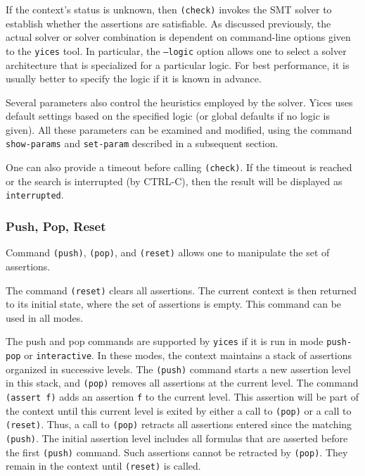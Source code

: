 \documentclass[11pt,twoside,fleqn,openright,titlepage]{cslreport}
\begin{document}
\medskip\noindent
If the context's status is unknown, then \texttt{(check)} invokes the
SMT solver to establish whether the assertions are satisfiable. As
discussed previously, the actual solver or solver combination is
dependent on command-line options given to the \texttt{yices} tool. In
particular, the \texttt{--logic} option allows one to select a solver
architecture that is specialized for a particular logic. For best
performance, it is usually better to specify the logic if it is known
in advance.

\medskip\noindent Several parameters also control the heuristics employed
by the solver. Yices uses default settings based on the specified logic
(or global defaults if no logic is given). All these parameters can be
examined and modified, using the command \texttt{show-params} and
\texttt{set-param} described in a subsequent section.

\medskip\noindent One can also provide a timeout before calling
\texttt{(check)}. If the timeout is reached or the search is
interrupted (by CTRL-C), then the result will be displayed as
\texttt{interrupted}.


\subsubsection*{Push, Pop, Reset}

Command \texttt{(push)}, \texttt{(pop)}, and \texttt{(reset)} allows
one to manipulate the set of assertions.

\medskip\noindent
The command \texttt{(reset)} clears all assertions. The current
context is then returned to its initial state, where the set of
assertions is empty. This command can be used in all modes.

\medskip\noindent
The push and pop commands are supported by \texttt{yices} if it is run
in mode \texttt{push-pop} or \texttt{interactive}. In these modes, the
context maintains a stack of assertions organized in successive
levels. The \texttt{(push)} command starts a new assertion level in
this stack, and \texttt{(pop)} removes all assertions at the current
level. The command \texttt{(assert f)} adds an assertion \texttt{f} to
the current level. This assertion will be part of the context until
this current level is exited by either a call to \texttt{(pop)} or a
call to \texttt{(reset)}. Thus, a call to \texttt{(pop)} retracts all
assertions entered since the matching \texttt{(push)}.  The initial
assertion level includes all formulas that are asserted before the
first \texttt{(push)} command. Such assertions cannot be retracted by
\texttt{(pop)}. They remain in the context until \texttt{(reset)} is
called.
\end{document}

